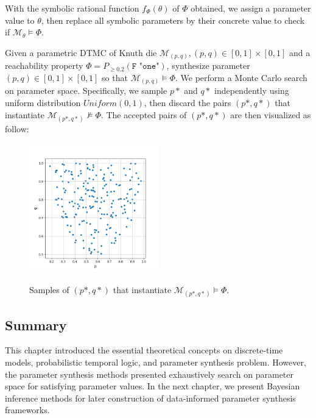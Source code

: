 With the symbolic rational function $f_\Phi(\theta)$ of $\Phi$ obtained, we assign a parameter value
to $\theta$, then replace all symbolic parameters by their concrete value to check if
$\mathcal{M}_\theta \models \Phi$.
\begin{example}
      Given a parametric DTMC of Knuth die $\mathcal{M}_{(p,q)}, (p,q)\in[0,1]\times[0,1]$ and a
      reachability property $\Phi = P_{\geq 0.2} (\texttt{F "one"})$, synthesize parameter
      $(p,q)\in[0,1]\times[0,1]$ so that $\mathcal{M}_{(p,q)} \models \Phi$. We perform a Monte
      Carlo search on parameter space. Specifically, we sample $p*$ and $q*$ independently using
      uniform distribution $Uniform(0,1)$, then discard the pairs $(p*,q*)$ that instantiate
      $\mathcal{M}_{(p*,q*)}\nvDash \Phi$. The accepted pairs of $(p*,q*)$ are then visualized as
      follow:
      \begin{figure}[H]
            \centering
            \includegraphics[width=0.5\textwidth]{figures/knuth_die_trueparams.png}
            \label{fig:knuth-die-pq-trueparams}
            \caption{Samples of $(p*,q*)$ that instantiate $\mathcal{M}_{(p*,q*)} \models \Phi$.}
      \end{figure}
\end{example}

\subsection{Summary}
This chapter introduced the essential theoretical concepts on discrete-time models, probabilistic
temporal logic, and parameter synthesis problem. However, the parameter synthesis methods presented
exhaustively search on parameter space for satisfying parameter values. In the next chapter, we
present Bayesian inference methods for later construction of data-informed parameter synthesis
frameworks.